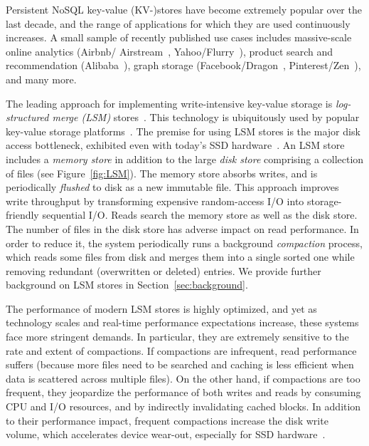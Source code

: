 
Persistent NoSQL key-value (KV-)stores have become extremely popular over the last decade, 
and the range of applications for which they are used continuously increases. A small sample of  recently 
published use cases includes massive-scale online analytics (Airbnb/ Airstream~\cite{airbnb}, 
Yahoo/Flurry~\cite{flurry}), product search 
and recommendation (Alibaba~\cite{alibabahbase}), 
graph storage (Facebook/Dragon~\cite{dragon}, 
Pinterest/Zen~\cite{zen}), and many more. 

The leading approach for implementing write-intensive key-value storage is \emph{log-structured merge (LSM)} stores~\cite{O'Neil1996}.
This technology is ubiquitously used by popular key-value storage platforms~\cite{leveldb, rocksdb, scylladb, Chang2008, cassandra, hbase, mongodb, mysql}. 
The premise for using LSM stores is the major disk access bottleneck, exhibited even with today's SSD hardware~\cite{rocksdb,Tanenbaum:2014:MOS:2655363,Wu:2012:AWB:2093139.2093140}. 
An LSM store includes a \emph{memory store} in addition to the large \emph{disk store} comprising a collection of files
(see Figure~\ref{fig:LSM}). 
The memory store absorbs writes, and is periodically \emph{flushed} to disk as a new immutable file. 
This approach improves write throughput by transforming expensive random-access I/O into storage-friendly sequential I/O. 
Reads search the memory store as well as the disk store. The number of files in the disk store has adverse impact on read performance. 
In order to reduce it, the system periodically runs a background \emph{compaction} process, which reads some files from 
disk and merges them into a single sorted one while removing redundant (overwritten or deleted) entries.
We provide further background on LSM stores in Section~\ref{sec:background}.

The performance of modern LSM stores is highly optimized, and yet as technology scales and real-time 
performance expectations increase, these systems face more stringent  demands. In particular, 
they are extremely sensitive to the rate and extent of compactions. If compactions are infrequent, read performance
suffers (because more files need to be searched and caching is less efficient when  data is scattered across multiple files). On the other hand, if 
compactions are too frequent, they jeopardize the performance of both writes and reads by consuming CPU and I/O resources, and by indirectly invalidating cached blocks. 
In addition to their performance impact, frequent compactions increase the disk write volume, which  
accelerates device wear-out, especially for SSD hardware~\cite{Hu:2009}. 

